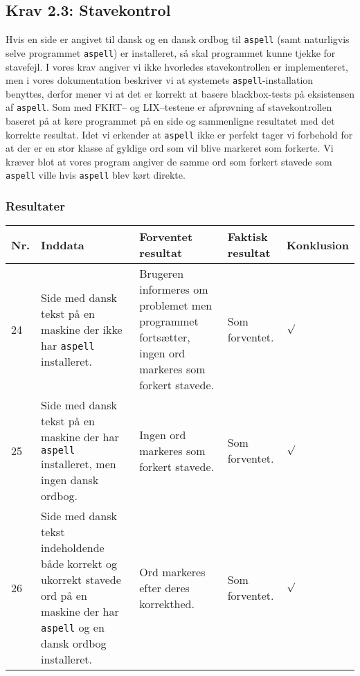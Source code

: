 \documentclass[a4paper,oneside,article]{memoir}
\begin{document}
\begin{landscape}
\begin{longtable}[c]{p{20pt}|p{220pt}|p{130pt}|p{130pt}|p{50pt}}
\end{longtable}

\subsection{Krav 2.3: Stavekontrol}

Hvis en side er angivet til dansk og en dansk ordbog til
\texttt{aspell} (samt naturligvis selve programmet \texttt{aspell}) er
installeret, så skal programmet kunne tjekke for stavefejl. I vores
krav angiver vi ikke hvorledes stavekontrollen er implementeret, men i
vores dokumentation beskriver vi at systemets
\texttt{aspell}-installation benyttes, derfor mener vi at det er
korrekt at basere blackbox-tests på eksistensen af
\texttt{aspell}. Som med FKRT-- og LIX--testene er afprøvning af
stavekontrollen baseret på at køre programmet på en side og
sammenligne resultatet med det korrekte resultat. Idet vi erkender at
\texttt{aspell} ikke er perfekt tager vi forbehold for at der er en
stor klasse af gyldige ord som vil blive markeret som forkerte. Vi
kræver blot at vores program angiver de samme ord som forkert stavede
som \texttt{aspell} ville hvis \texttt{aspell} blev kørt direkte.
\subsubsection{Resultater}
\begin{longtable}[c]{p{20pt}|p{220pt}|p{130pt}|p{130pt}|p{50pt}}
\textbf{Nr.} &
\textbf{Inddata} &
\textbf{Forventet resultat} &
\textbf{Faktisk resultat} &
\textbf{Konklusion} \\ \hline

24 &
Side med dansk tekst på en maskine der ikke har \texttt{aspell}
installeret. &
Brugeren informeres om problemet men programmet fortsætter, ingen ord
markeres som forkert stavede. &
Som forventet. &
$\surd$ \\ \hline

25 &
Side med dansk tekst på en maskine der har \texttt{aspell}
installeret, men ingen dansk ordbog. &
Ingen ord markeres som forkert stavede. &
Som forventet. &
$\surd$ \\ \hline

26 &
Side med dansk tekst indeholdende både korrekt og ukorrekt stavede ord
på en maskine der har \texttt{aspell}
og en dansk ordbog installeret. &
Ord markeres efter deres korrekthed. &
Som forventet. &
$\surd$ \\ \hline

\end{longtable}


\end{landscape}
\end{document}
